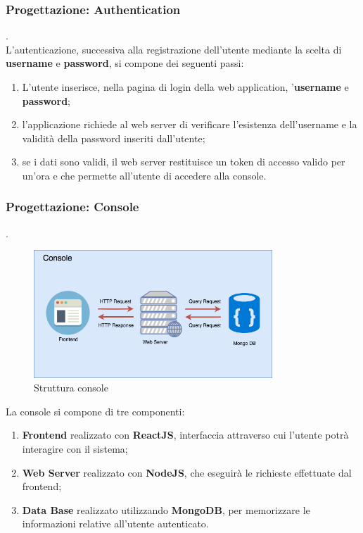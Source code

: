 \documentclass{llncs}
\begin{document}
\subsubsection{Progettazione: Authentication} .
\label{ProgettazioneReq1Auth}
\vspace*{1ex}
\\
L'autenticazione, successiva alla registrazione dell'utente mediante la scelta di \textbf{username} e \textbf{password}, si compone dei seguenti passi:
\begin{enumerate}
    \item L'utente inserisce, nella pagina di login della web application, '\textbf{username} e  \textbf{password};
    \item l'applicazione richiede al web server di verificare l'esistenza dell'username e la validit\`a della password inseriti dall'utente;
    \item se i dati sono validi, il web server restituisce un token di accesso valido per un'ora e che permette all'utente di accedere alla console.
\end{enumerate}

\subsubsection{Progettazione: Console} .
\label{ProgettazioneReq1Console}
\vspace*{1ex}
\\
\begin{figure}
    \centering
    \includegraphics[width=0.8\textwidth]{Immagini/Console-diagram.png}
    \caption{Struttura console}
    \label{fig:my_label}
\end{figure}
\vspace*{1ex}
La console si compone di tre componenti:
\begin{enumerate}
    \item \textbf{Frontend} realizzato con \textbf{ReactJS}, interfaccia attraverso cui l'utente potr\`a interagire con il sistema;
    \item \textbf{Web Server} realizzato con \textbf{NodeJS}, che eseguir\`a le richieste effettuate dal frontend;
    \item \textbf{Data Base} realizzato utilizzando \textbf{MongoDB}, per memorizzare le informazioni relative all'utente autenticato.
\end{enumerate}
\end{document}
